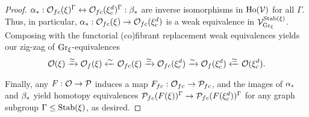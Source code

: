 \documentclass[a4paper,10pt
,draft
]{article}%
\renewcommand{\1}{\ensuremath{\mathbb{id}}}
\begin{document}
\begin{proof}
      $\alpha_{\**}: \O_{f c}(\ksi)^\Gamma \leftrightarrow \O_{f c}(\ksi_c^d)^\Gamma : \beta_{\**}$ are inverse isomorphisms in $\operatorname{Ho}(\mathcal V)$ for all $\Gamma$.
      Thus, in particular, $\alpha_{\**}: \O_{f c}(\ksi) \to \O_{f c}(\ksi_c^d)$ is a weak equivalence in $\mathcal V^{\mathrm{Stab}(\xi)}_{\mathrm{Gr}_\xi}$.
      Composing with the functorial (co)fibrant replacement weak equivalences yields our zig-zag of $\mathrm{Gr}_\xi$-equivalences
      \begin{equation}
            \mathcal{O}(\xi) \xrightarrow{\simeq} \mathcal{O}_f(\xi) \xleftarrow{\sim} \mathcal{O}_{f c}(\xi)
            \xrightarrow{\simeq}
            \mathcal{O}_{f c}(\xi_c^d) \xrightarrow{\sim} \mathcal{O}_f(\xi_c^d) \xleftarrow{\simeq} \mathcal{O}(\xi_c^d).
      \end{equation}
      
      Finally, any $F: \mathcal{O} \to \mathcal{P}$ induces a map $F_{f c}: \mathcal{O}_{f c} \to \mathcal{P}_{f c}$, and
      the images of $\alpha_{\**}$ and $\beta_{\**}$ yield
      homotopy equivalences $\mathcal{P}_{f c}(F(\xi))^\Gamma \to \mathcal{P}_{f c}(F(\xi_c^d))^\Gamma$ for any graph subgroup $\Gamma \leq \mathrm{Stab}(\xi)$,
      as desired.
\end{proof}
\end{document}
